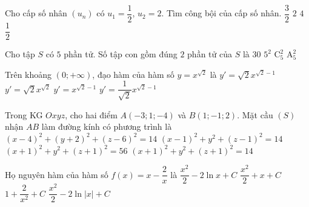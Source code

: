 \begin{ex}%
	Cho cấp số nhân $\left(u_n\right)$ có $u_1=\dfrac{1}{2}$, $u_2=2$. Tìm công bội của cấp số nhân.
	\choice
	{$\dfrac{3}{2}$}
	{$2$}
	{\True $4$}
	{$\dfrac{1}{2}$}
\end{ex}

\begin{ex}%
	Cho tập $S$ có $5$ phần tử. Số tập con gồm đúng $2$ phần tử của $S$ là
	\choice
	{$30$}
	{$5^2$}
	{\True $\mathrm{C}_5^2$}
	{$\mathrm{A}_5^2$}
\end{ex}

\begin{ex}%
	Trên khoảng $(0;+\infty)$, đạo hàm của hàm số $y=x^{\sqrt{2}}$ là
	\choice
	{\True $y'=\sqrt{2}x^{\sqrt{2}-1}$}
	{$y'=\sqrt{2}x^{\sqrt{2}}$}
	{$y'=x^{\sqrt{2}-1}$}
	{$y'=\dfrac{1}{\sqrt{2}}x^{\sqrt{2}-1}$}
\end{ex}

\begin{ex}%
	Trong KG $Oxyz$, cho hai điểm $A\left(-3;1;-4\right)$ và $B\left(1;-1;2\right)$. Mặt cầu $(S)$ nhận $AB$ làm đường kính có phương trình là
	\choice
	{$\left(x-4\right)^2+\left(y+2\right)^2+\left(z-6\right)^2=14$}
	{$\left(x-1\right)^2+y^2+\left(z-1\right)^2=14$}
	{$\left(x+1\right)^2+y^2+\left(z+1\right)^2=56$}
	{\True $\left(x+1\right)^2+y^2+\left(z+1\right)^2=14$}
\end{ex}

\begin{ex}%
	Họ nguyên hàm của hàm số $f(x)=x-\dfrac{2}{x}$ là
	\choice
	{$\dfrac{x^2}{2}-2\ln x+C$}
	{$\dfrac{x^2}{2}+x+C$}
	{$1+\dfrac{2}{x^2}+C$}
	{\True $\dfrac{x^2}{2}-2\ln \left|x\right|+C$}
\end{ex}

